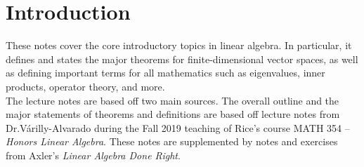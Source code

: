 \documentclass{memoir}
\begin{document}

\chapter{Introduction}
\label{cha:introduction}


These notes cover the core introductory topics in linear algebra. In particular, it defines and states the major theorems for finite-dimensional vector spaces, as well as defining important terms for all mathematics such as eigenvalues, inner products, operator theory, and more.\\

The lecture notes are based off two main sources. The overall outline and the major statements of theorems and definitions are based off lecture notes from Dr.\@ Várilly-Alvarado during the Fall 2019 teaching of Rice's course MATH 354 -- \textit{Honors Linear Algebra}. These notes are supplemented by notes and exercises from Axler's \textit{Linear Algebra Done Right}.

\end{document}

